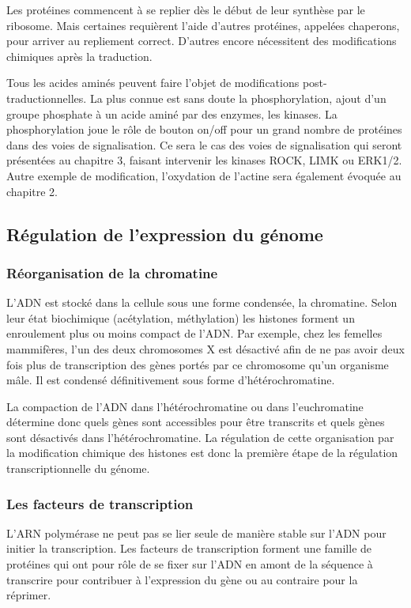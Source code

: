 Les protéines commencent à se replier dès le début de leur synthèse par le ribosome. Mais certaines requièrent l'aide d'autres protéines, appelées chaperons, pour arriver au repliement correct. D'autres encore nécessitent des modifications chimiques après la traduction. 

Tous les acides aminés peuvent faire l'objet de modifications post-traductionnelles. La plus connue est sans doute la phosphorylation, ajout d'un groupe phosphate à un acide aminé par des enzymes, les kinases. La phosphorylation joue le rôle de bouton on/off pour un grand nombre de protéines dans des voies de signalisation. Ce sera le cas des voies de signalisation qui seront présentées au chapitre 3, faisant intervenir les kinases ROCK, LIMK ou ERK1/2. 
Autre exemple de modification, l'oxydation de l'actine sera également évoquée au chapitre 2. 


\subsection{Régulation de l'expression du génome}

\subsubsection{Réorganisation de la chromatine}

L'ADN est stocké dans la cellule sous une forme condensée, la chromatine. Selon leur état biochimique (acétylation, méthylation) les histones forment un enroulement plus ou moins compact de l'ADN. Par exemple, chez les femelles mammifères, l'un des deux chromosomes X est désactivé afin de ne pas avoir deux fois plus de transcription des gènes portés par ce chromosome qu'un organisme mâle. Il est condensé définitivement sous forme d'hétérochromatine. 

La compaction de l'ADN dans l'hétérochromatine ou dans l'euchromatine détermine donc quels gènes sont accessibles pour être transcrits et quels gènes sont désactivés dans l'hétérochromatine. 
La régulation de cette organisation par la modification chimique des histones est donc la première étape de la régulation transcriptionnelle du génome. 

\subsubsection{Les facteurs de transcription}

L'ARN polymérase ne peut pas se lier seule de manière stable sur l'ADN pour initier la transcription. 
Les facteurs de transcription forment une famille de protéines qui ont pour rôle de se fixer sur l'ADN en amont de la séquence à transcrire pour contribuer à l'expression du gène ou au contraire pour la réprimer. 

